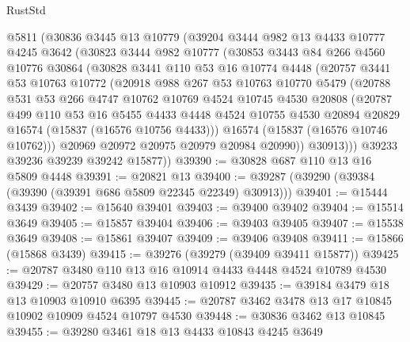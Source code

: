 \begin{lexlean}{RustStd}
\begin{coremodule}
{\begin{coremodule}
{{{{{{{{{{{{{{{{{{{{{{{{{{{{{{{{{{{{{{{{{{{{{{{{{{{{{{{{{{{{    @5811
    (@30836
      @3445
      @13
      @10779
      (@39204
        @3444
        @982
        @13
        @4433
        @10777
        @4245
        @3642
        (@30823
          @3444
          @982
          @10777
          (@30853
            @3443
            @84
            @266
            @4560
            @10776
            @30864
            (@30828
              @3441
              @110
              @53
              @16
              @10774
              @4448
              (@20757
                @3441
                @53
                @10763
                @10772
                (@20918
                  @988
                  @267
                  @53
                  @10763
                  @10770
                  @5479
                  (@20788
                    @531
                    @53
                    @266
                    @4747
                    @10762
                    @10769
                    @4524
                    @10745
                    @4530
                    @20808
                    (@20787
                      @499
                      @110
                      @53
                      @16
                      @5455
                      @4433
                      @4448
                      @4524
                      @10755
                      @4530
                      @20894
                      @20829
                      @16574
                      (@15837 (@16576 @10756 @4433)))
                    @16574
                    (@15837 (@16576 @10746 @10762)))
                  @20969
                  @20972
                  @20975
                  @20979
                  @20984
                  @20990))
              @30913)))
        @39233
        @39236
        @39239
        @39242
        @15877))
@39390 := @30828 @687 @110 @13 @16 @5809 @4448
@39391 := @20821 @13
@39400 := @39287 (@39290 (@39384 (@39390 (@39391 @686 @5809 @22345 @22349) @30913)))
@39401 := @15444 @3439
@39402 := @15640 @39401
@39403 := @39400 @39402
@39404 := @15514 @3649
@39405 := @15857 @39404
@39406 := @39403 @39405
@39407 := @15538 @3649
@39408 := @15861 @39407
@39409 := @39406 @39408
@39411 := @15866 (@15868 @3439)
@39415 := @39276 (@39279 (@39409 @39411 @15877))
@39425 := @20787 @3480 @110 @13 @16 @10914 @4433 @4448 @4524 @10789 @4530
@39429 := @20757 @3480 @13 @10903 @10912
@39435 := @39184 @3479 @18 @13 @10903 @10910 @6395
@39445 := @20787 @3462 @3478 @13 @17 @10845 @10902 @10909 @4524 @10797 @4530
@39448 := @30836 @3462 @13 @10845
@39455 := @39280 @3461 @18 @13 @4433 @10843 @4245 @3649
}}}}}}}}}}}}}}}}}}}}}}}}}}}}}}}}}}}}}}}}}}}}}}}}}}}}}}}}}}}}
\end{coremodule}}
\end{coremodule}
\end{lexlean}
